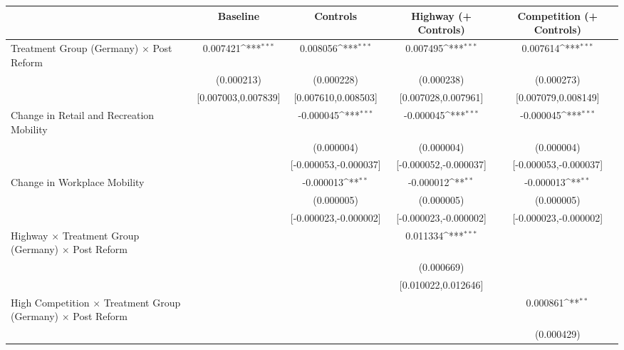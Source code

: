 {
\def\sym#1{\ifmmode^{#1}\else\(^{#1}\)\fi}
\begin{tabular}{l*{4}{c}}
\toprule
                    &\multicolumn{1}{c}{Baseline}&\multicolumn{1}{c}{Controls}&\multicolumn{1}{c}{Highway (+ Controls)}&\multicolumn{1}{c}{Competition (+ Controls)}\\
\midrule
Treatment Group (Germany) $\times$ Post Reform&    0.007421\sym{***}&    0.008056\sym{***}&    0.007495\sym{***}&    0.007614\sym{***}\\
                    &  (0.000213)         &  (0.000228)         &  (0.000238)         &  (0.000273)         \\
                    &[0.007003,0.007839]         &[0.007610,0.008503]         &[0.007028,0.007961]         &[0.007079,0.008149]         \\
Change in Retail and Recreation Mobility&                     &   -0.000045\sym{***}&   -0.000045\sym{***}&   -0.000045\sym{***}\\
                    &                     &  (0.000004)         &  (0.000004)         &  (0.000004)         \\
                    &                     &[-0.000053,-0.000037]         &[-0.000052,-0.000037]         &[-0.000053,-0.000037]         \\
Change in Workplace Mobility&                     &   -0.000013\sym{**} &   -0.000012\sym{**} &   -0.000013\sym{**} \\
                    &                     &  (0.000005)         &  (0.000005)         &  (0.000005)         \\
                    &                     &[-0.000023,-0.000002]         &[-0.000023,-0.000002]         &[-0.000023,-0.000002]         \\
Highway $\times$ Treatment Group (Germany) $\times$ Post Reform&                     &                     &    0.011334\sym{***}&                     \\
                    &                     &                     &  (0.000669)         &                     \\
                    &                     &                     &[0.010022,0.012646]         &                     \\
High Competition $\times$ Treatment Group (Germany) $\times$ Post Reform&                     &                     &                     &    0.000861\sym{**} \\
                    &                     &                     &                     &  (0.000429)         \\

\end{tabular}}
